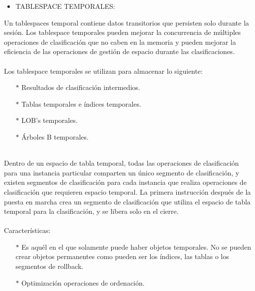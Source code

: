 \begin{itemize}
	\item TABLESPACE TEMPORALES:
\end{itemize}
\begin{adjustwidth}{0.40in}{0.0in}
	Un tablespaces temporal contiene datos transitorios que persisten solo durante la sesión. Los tablespace temporales pueden mejorar la concurrencia de múltiples operaciones de clasificación que no caben en la memoria y pueden mejorar la eficiencia de las operaciones de gestión de espacio durante las clasificaciones.\\ \\
	Los tablespace temporales se utilizan para almacenar lo siguiente:
	\begin{itemize}
		\item[$*$] Resultados de clasificación intermedios.
		\item[$*$] Tablas temporales e índices temporales.
		\item[$*$] LOB's temporales.
		\item[$*$] Árboles B temporales.\\
\\
	\end{itemize}
	Dentro de un espacio de tabla temporal, todas las operaciones de clasificación para una instancia particular comparten un único segmento de clasificación, y existen segmentos de clasificación para cada instancia que realiza operaciones de clasificación que requieren espacio temporal. La primera instrucción después de la puesta en marcha crea un segmento de clasificación que utiliza el espacio de tabla temporal para la clasificación, y se libera solo en el cierre.\\ \\
	Características:
	\begin{itemize}
		\item[$*$] Es aquél en el que solamente puede haber objetos temporales. No se pueden crear objetos permanentes como pueden ser los índices, las tablas o los segmentos de rollback.
		\item[$*$] Optimización operaciones de ordenación.\\
\\
	\end{itemize}		
\end{adjustwidth}

